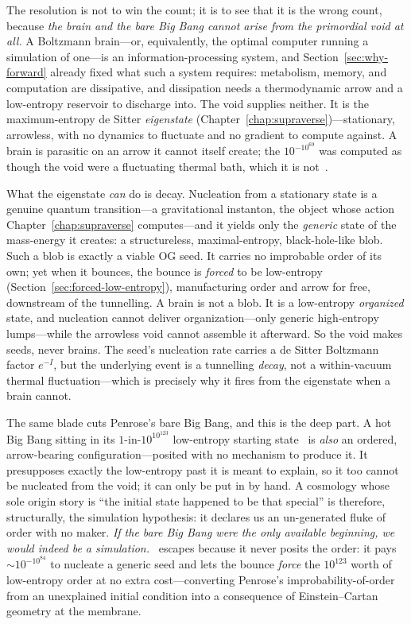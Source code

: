 The resolution is not to win the count; it is to see that it is the wrong count,
because \emph{the brain and the bare Big Bang cannot arise from the primordial
void at all.} A Boltzmann brain---or, equivalently, the optimal computer running
a simulation of one---is an information-processing system, and
Section~\ref{sec:why-forward} already fixed what such a system requires:
metabolism, memory, and computation are dissipative, and dissipation needs a
thermodynamic arrow and a low-entropy reservoir to discharge into. The void
supplies neither. It is the maximum-entropy de Sitter \emph{eigenstate}
(Chapter~\ref{chap:supraverse})---stationary, arrowless, with no dynamics to
fluctuate and no gradient to compute against. A brain is parasitic on an arrow it
cannot itself create; the $10^{-10^{69}}$ was computed as though the void were a
fluctuating thermal bath, which it is not~\citep{boddy2014}.

What the eigenstate \emph{can} do is decay. Nucleation from a stationary state is
a genuine quantum transition---a gravitational instanton, the object whose action
Chapter~\ref{chap:supraverse} computes---and it yields only the \emph{generic}
state of the mass-energy it creates: a structureless, maximal-entropy,
black-hole-like blob. Such a blob is exactly a viable OG seed. It carries no
improbable order of its own; yet when it bounces, the bounce is \emph{forced} to
be low-entropy (Section~\ref{sec:forced-low-entropy}), manufacturing order and
arrow for free, downstream of the tunnelling. A brain is not a blob. It is a
low-entropy \emph{organized} state, and nucleation cannot deliver
organization---only generic high-entropy lumps---while the arrowless void cannot
assemble it afterward. So the void makes seeds, never brains. The seed's
nucleation rate carries a de Sitter Boltzmann factor $e^{-I}$, but the underlying
event is a tunnelling \emph{decay}, not a within-vacuum thermal
fluctuation---which is precisely why it fires from the eigenstate when a brain
cannot.

The same blade cuts Penrose's bare Big Bang, and this is the deep part. A hot
Big Bang sitting in its $1$-in-$10^{10^{123}}$ low-entropy starting
state~\citep{penrose2010} is \emph{also} an ordered, arrow-bearing
configuration---posited with no mechanism to produce it. It presupposes exactly
the low-entropy past it is meant to explain, so it too cannot be nucleated from
the void; it can only be put in by hand. A cosmology whose sole origin story is
``the initial state happened to be that special'' is therefore, structurally, the
simulation hypothesis: it declares us an un-generated fluke of order with no
maker. \emph{If the bare Big Bang were the only available beginning, we would
indeed be a simulation.} \SCT\ escapes because it never posits the order: it pays
$\sim 10^{-10^{84}}$ to nucleate a generic seed and lets the bounce \emph{force}
the $10^{123}$ worth of low-entropy order at no extra cost---converting Penrose's
improbability-of-order from an unexplained initial condition into a consequence
of Einstein--Cartan geometry at the membrane.

